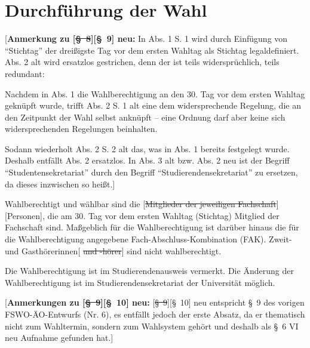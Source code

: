 \documentclass[%
draft,%
multilinesections%
]{fswo}
\newcommand\oldT[1]  {{\color{Gray}[\st{#1}]}}
\newcommand\newT[1]  {{\color{Green}[#1]}}
\newcommand\bemFr[1] {{\color{Red}[#1]}}
\newcommand\oldT[1]{}%
\newcommand\newT[1]{#1}
\newcommand\bemFr[1]{}%
\newcommand\change[2]{\oldT{#1}\newT{#2}}
\begin{document}
\section{Durchführung der Wahl}

\bemFr{\textbf{Anmerkung zu \change{\S~8}{\S~9} neu:} %
In Abs. 1 S. 1 wird durch Einfügung von \enquote{Stichtag} der dreißigste Tag vor dem ersten Wahltag als Stichtag legaldefiniert. Abs. 2 alt wird ersatzlos gestrichen, denn der ist teils widersprüchlich, teils redundant:

Nachdem in Abs. 1 die Wahlberechtigung an den 30. Tag vor dem ersten Wahltag geknüpft wurde, trifft Abs. 2 S. 1 alt eine dem widersprechende Regelung, die an den Zeitpunkt der Wahl selbst anknüpft -- eine Ordnung darf aber keine sich widersprechenden Regelungen beinhalten.

Sodann wiederholt Abs. 2 S. 2 alt das, was in Abs. 1 bereits festgelegt wurde.
Deshalb entfällt Abs. 2 ersatzlos. In Abs. 3 alt bzw. Abs. 2 neu ist der Begriff \enquote{Studentensekretariat} durch den Begriff \enquote{Studierendensekretariat} zu ersetzen, da dieses inzwischen so heißt.}


\begin{contract}
Wahlberechtigt und wählbar sind die \change{Mitglieder der jeweiligen Fachschaft}{Personen}, die am 30. Tag vor dem ersten Wahltag (Stichtag) Mitglied der Fachschaft sind.
Maßgeblich für die Wahlberechtigung ist darüber hinaus die für die Wahlberechtigung angegebene Fach-Abschluss-Kombination (FAK).
Zweit- und Gasthörerinnen\oldT{ und -hörer} sind nicht wahlberechtigt.

Die Wahlberechtigung ist im Studierendenausweis vermerkt.
Die Änderung der Wahlberechtigung ist im Studierendensekretariat der Universität möglich.
\end{contract}

\bemFr{\textbf{Anmerkungen zu \change{\S~9}{\S~10} neu:}
\change{\S~9}{\S~10} neu entspricht \S~9 des vorigen FSWO-ÄO-Entwurfs (Nr. 6), es entfällt jedoch der erste Absatz, da er thematisch nicht zum Wahltermin, sondern zum Wahlsystem gehört
und deshalb als \S~6 VI neu Aufnahme gefunden hat.}
\end{document}
